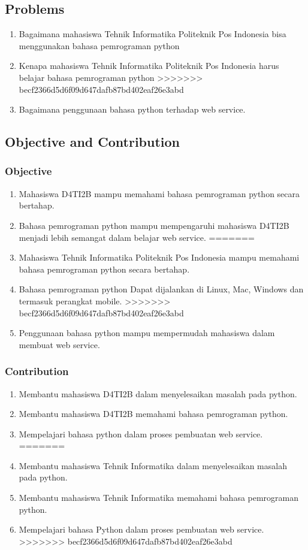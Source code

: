 \begin{enumerate}
\subsection{Problems}
	\begin{enumerate}
		\item Bagaimana mahasiswa Tehnik Informatika Politeknik Pos Indonesia bisa menggunakan bahasa pemrograman python
		\item Kenapa mahasiswa Tehnik Informatika Politeknik Pos Indonesia harus belajar bahasa pemrograman python
>>>>>>> becf2366d5d6f09d647dafb87bd402eaf26e3abd
		\item Bagaimana penggunaan bahasa python terhadap web service.
	\end{enumerate}
	
\subsection{Objective and Contribution}
	\subsubsection{Objective}
		\begin{enumerate}
<<<<<<< HEAD
			\item Mahasiswa D4TI2B mampu memahami bahasa pemrograman python secara bertahap.
			\item Bahasa pemrograman python mampu mempengaruhi mahasiswa D4TI2B menjadi lebih semangat dalam belajar web service.
=======
			\item Mahasiswa Tehnik Informatika Politeknik Pos Indonesia mampu memahami bahasa pemrograman python secara bertahap.
			\item Bahasa pemrograman python Dapat dijalankan di Linux, Mac, Windows dan termasuk perangkat mobile.
>>>>>>> becf2366d5d6f09d647dafb87bd402eaf26e3abd
			\item Penggunaan bahasa python mampu mempermudah mahasiswa dalam membuat web service.
		\end{enumerate}
	\subsubsection{Contribution}
		\begin{enumerate}
<<<<<<< HEAD
			\item Membantu mahasiswa D4TI2B dalam menyelesaikan masalah pada python.
			\item Membantu mahasiswa D4TI2B memahami bahasa pemrograman python.
			\item Mempelajari bahasa python dalam proses pembuatan web service.
=======
			\item Membantu mahasiswa Tehnik Informatika dalam menyelesaikan masalah pada python.
			\item Membantu mahasiswa Tehnik Informatika memahami bahasa pemrograman python.
			\item Mempelajari bahasa Python dalam proses pembuatan web service.
>>>>>>> becf2366d5d6f09d647dafb87bd402eaf26e3abd
		\end{enumerate}
		

\end{enumerate}
